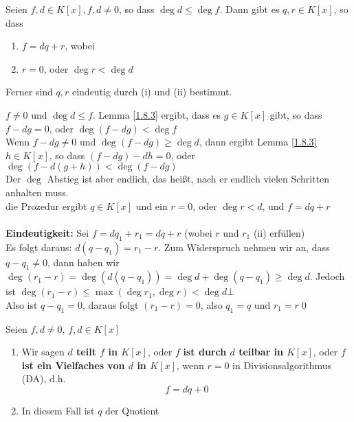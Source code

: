 \begin{subtheorem}[Divisionsalgorithmus in $ {K[x]} $]
	Seien $ f, d \in K[x], f, d \neq 0 $, so dass $ \deg d \leq  \deg f $.
	Dann gibt es $ q, r \in K[x] $, so dass
	\begin{enumerate}[label=(\roman*)]
		\item $ f = dq + r $, wobei
		\item $ r = 0 $, oder $ \deg r < \deg d $
	\end{enumerate}
	Ferner sind $ q, r $ eindeutig durch (i) und (ii) bestimmt.
\end{subtheorem}
\begin{subproof*}
	$ f \neq 0 $ und $ \deg d \leq f $. Lemma \ref{1.8.3} ergibt, dass es $ g \in K[x] $ gibt, so dass $ f - d g = 0 $, oder $ \deg(f - dg) < \deg f $\\
	 Wenn $ f - dg \neq 0 $ und $ \deg (f - dg) \geq \deg d $,
	 dann ergibt Lemma \ref{1.8.3} $ h \in K[x] $, so dass $ (f - dg) - dh = 0 $, oder $ \deg (f - d(g + h)) < \deg (f - dg) $\\
	 Der $ \deg $ Abstieg ist aber endlich, das heißt, nach er endlich vielen Schritten anhalten muss.\\
	 die Prozedur ergibt $ q \in K[x] $ und ein $ r = 0 $, oder $ \deg r < d $, und $ f = dq + r $\\~\\
	 \textbf{Eindeutigkeit:} Sei $ f = dq_1 + r_1 = dq + r $ (wobei $ r $ und $ r_1 $ (ii) erfüllen)\\
	 Es folgt daraus: $ d( q - q_1) = r_1 - r $.
	 Zum Widerspruch nehmen wir an, dass $ q - q_1 \neq 0 $, dann haben wir $ \deg (r_1 - r) = \deg( d (q - q_1)) = \deg d + \deg (q - q_1) \geq \deg d $. Jedoch ist $ \deg (r_1 - r) \leq \max \left( \deg r_1, \deg r \right) < \deg d \bot $\\
	 Also ist $ q - q_1 = 0 $, daraus folgt $ (r_1 - r) = 0 $, also $ q_1 = q $ und $ r_1 = r $\qed
\end{subproof*}

\begin{subdefinition}
	Seien $ f, d \neq 0 $, $ f, d \in K[x] $
	\begin{enumerate}[label=(\roman*)]
		\item 
			Wir sagen \textbf{$ d $ teilt $ f $ in $ K[x] $}, oder $ f $ \textbf{ist durch $ d $ teilbar in $ K[x] $}, oder \textbf{$ f $ ist ein Vielfaches von $ d $ in $ K[x] $}, wenn $ r = 0 $ in Divisionsalgorithmus (DA), d.h.
			\[
				f = dq + 0
			\]
		\item In diesem Fall ist $ q $ der Quotient
	\end{enumerate}
	
	
\end{subdefinition}

